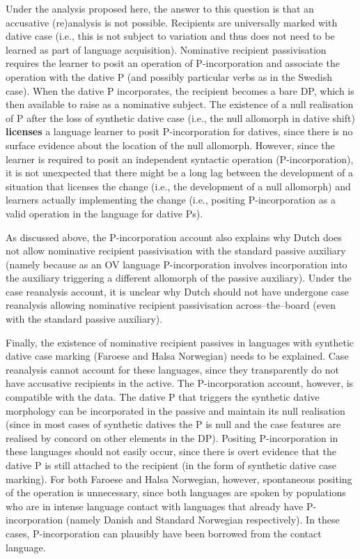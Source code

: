 Under the analysis proposed here, the answer to this question is that an accusative (re)analysis is not possible. Recipients are universally marked with dative case (i.e., this is not subject to variation and thus does not need to be learned as part of language acquisition). Nominative recipient passivisation requires the learner to posit an operation of P-incorporation and associate the operation with the dative P (and possibly particular verbs as in the Swedish case). When the dative P incorporates, the recipient becomes a bare DP, which is then available to raise as a nominative subject. The existence of a null realisation of P after the loss of synthetic dative case (i.e., the null allomorph in dative shift) \textbf{licenses} a language learner to posit P-incorporation for datives, since there is no surface evidence about the location of the null allomorph. However, since the learner is required to posit an independent syntactic operation (P-incorporation), it is not unexpected that there might be a long lag between the development of a situation that licenses the change (i.e., the development of a null allomorph) and learners actually implementing the change (i.e., positing P-incorporation as a valid operation in the language for dative Ps).

As discussed above, the P-incorporation account also explains why Dutch does not allow nominative recipient passivisation with the standard passive auxiliary (namely because as an OV language P-incorporation involves incorporation into the auxiliary triggering a different allomorph of the passive auxiliary). Under the case reanalysis account, it is unclear why Dutch should not have undergone case reanalysis allowing nominative recipient passivisation across--the--board (even with the standard passive auxiliary).

Finally, the existence of nominative recipient passives in languages with synthetic dative case marking (Faroese and Halsa Norwegian) needs to be explained. Case reanalysis cannot account for these languages, since they transparently do not have accusative recipients in the active. The P-incorporation account, however, is compatible with the data. The dative P that triggers the synthetic dative morphology can be incorporated in the passive and maintain its null realisation (since in most cases of synthetic datives the P is null and the case features are realised by concord on other elements in the DP). Positing P-incorporation in these languages should not easily occur, since there is overt evidence that the dative P is still attached to the recipient (in the form of synthetic dative case marking). For both Faroese and Halsa Norwegian, however, spontaneous positing of the operation is unnecessary, since both languages are spoken by populations who are in intense language contact with languages that already have P-incorporation (namely Danish and Standard Norwegian respectively). In these cases, P-incorporation can plausibly have been borrowed from the contact language.


